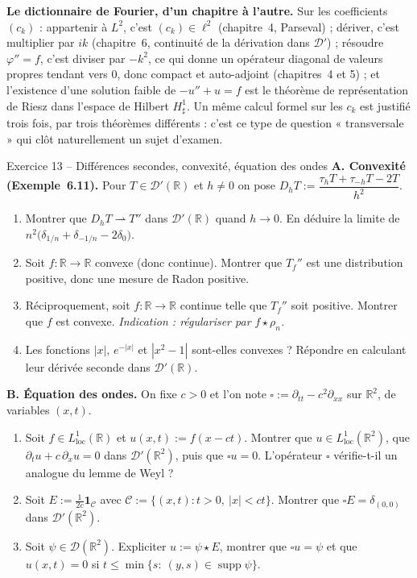 \documentclass[11pt,a4paper]{article}
\newcommand{\R}{\mathbb{R}}
\newcommand{\wk}{\rightharpoonup}
\DeclareMathOperator{\supp}{supp}
\newcommand{\D}{\mathcal{D}}
\theoremstyle{definition}
\begin{document}
\begin{pointcle}
\textbf{Le dictionnaire de Fourier, d'un chapitre à l'autre.} Sur les coefficients $(c_k)$ : appartenir à $L^2$, c'est $(c_k)\in\ell^2$ (chapitre~4, Parseval) ; dériver, c'est multiplier par $ik$ (chapitre~6, continuité de la dérivation dans $\D'$) ; résoudre $\varphi''=f$, c'est diviser par $-k^2$, ce qui donne un opérateur diagonal de valeurs propres tendant vers $0$, donc compact et auto-adjoint (chapitres~4 et 5) ; et l'existence d'une solution faible de $-u''+u=f$ est le théorème de représentation de Riesz dans l'espace de Hilbert $H^1_\sharp$. Un même calcul formel sur les $c_k$ est justifié trois fois, par trois théorèmes différents : c'est ce type de question « transversale » qui clôt naturellement un sujet d'examen.
\end{pointcle}


\begin{exo}{Exercice 13 -- Différences secondes, convexité, équation des ondes}
\textbf{A. Convexité (Exemple~6.11).} Pour $T\in\D'(\R)$ et $h\ne0$ on pose $D_hT:=\dfrac{\tau_hT+\tau_{-h}T-2T}{h^2}$.
\begin{enumerate}[label=(\alph*)]
  \item Montrer que $D_hT\wk T''$ dans $\D'(\R)$ quand $h\to0$. En déduire la limite de $n^2\big(\delta_{1/n}+\delta_{-1/n}-2\delta_0\big)$.
  \item Soit $f:\R\to\R$ convexe (donc continue). Montrer que $T_f''$ est une distribution positive, donc une mesure de Radon positive.
  \item Réciproquement, soit $f:\R\to\R$ continue telle que $T_f''$ soit positive. Montrer que $f$ est convexe. \emph{Indication : régulariser par $f\star\rho_n$.}
  \item Les fonctions $|x|$, $e^{-|x|}$ et $|x^2-1|$ sont-elles convexes ? Répondre en calculant leur dérivée seconde dans $\D'(\R)$.
\end{enumerate}
\textbf{B. Équation des ondes.} On fixe $c>0$ et l'on note $\square:=\partial_{tt}-c^2\partial_{xx}$ sur $\R^2$, de variables $(x,t)$.
\begin{enumerate}[label=(\alph*),resume]
  \item Soit $f\in L^1_{\mathrm{loc}}(\R)$ et $u(x,t):=f(x-ct)$. Montrer que $u\in L^1_{\mathrm{loc}}(\R^2)$, que $\partial_tu+c\,\partial_xu=0$ dans $\D'(\R^2)$, puis que $\square u=0$. L'opérateur $\square$ vérifie-t-il un analogue du lemme de Weyl ?
  \item Soit $E:=\frac1{2c}\mathbf 1_{\mathcal C}$ avec $\mathcal C:=\{(x,t):t>0,\ |x|<ct\}$. Montrer que $\square E=\delta_{(0,0)}$ dans $\D'(\R^2)$.
  \item Soit $\psi\in\D(\R^2)$. Expliciter $u:=\psi\star E$, montrer que $\square u=\psi$ et que $u(x,t)=0$ si $t\le\min\{s:\ (y,s)\in\supp\psi\}$.
\end{enumerate}
\end{exo}
\end{document}
